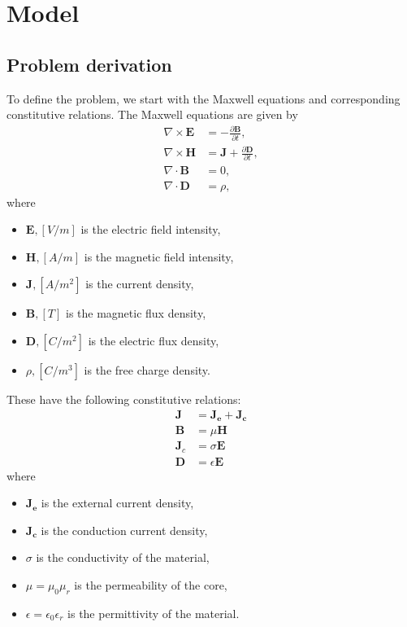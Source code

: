 \chapter{Model} \label{sec:model}


\section{Problem derivation}

To define the problem, we start with the Maxwell equations and corresponding constitutive relations. The Maxwell equations are given by
\begin{align*}
    \nabla \times \mathbf{E} &= -\frac{\partial \mathbf{B}}{\partial t}, \\
    \nabla \times \mathbf{H} &=  \mathbf{J} + \frac{\partial \mathbf{D}}{\partial t}, \\
    \nabla \cdot \mathbf{B} &= 0, \\
    \nabla \cdot \mathbf{D} &= \rho,
\end{align*}
where
\begin{itemize}
    \item $\mathbf{E}, [V/m]$ is the electric field intensity,
    \item $\mathbf{H}, [A/m]$ is the magnetic field intensity,
    \item $\mathbf{J}, [A/m^2]$ is the current density,
    \item $\mathbf{B}, [T]$ is the magnetic flux density,
    \item $\mathbf{D}, [C/m^2]$ is the electric flux density,
    \item $\rho, [C/m^3]$ is the free charge density.
\end{itemize}

\noindent These have the following constitutive relations:
\begin{align*}
    \mathbf{J} &= \mathbf{J_e} + \mathbf{J_c} \\
    \mathbf{B} &= \mu\mathbf{H} \\
    \mathbf{J}_c &= \sigma\mathbf E \\
    \mathbf{D} &= \epsilon \mathbf E
\end{align*}
where
\begin{itemize}
    \item $\mathbf{J_e}$ is the external current density,
    \item $\mathbf{J_c}$ is the conduction current density,
    \item $\sigma$ is the conductivity of the material,
    \item $\mu = \mu_0\mu_r$ is the permeability of the core,
    \item $\epsilon = \epsilon_0\epsilon_r$ is the permittivity of the material.
\end{itemize}

